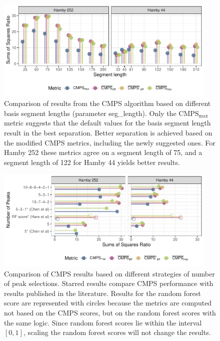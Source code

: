 \begin{Schunk}
\begin{figure}

{\centering \includegraphics[width=400px]{ju-hofmann_files/figure-latex/param-seg-plot-1} 

}

\caption[Comparison of results from the CMPS algorithm based on different basis segment lengths (parameter seg\_length)]{Comparison of results from the CMPS algorithm based on different basis segment lengths (parameter seg\_length). Only the $\mathrm{CMPS_{max}}$ metric suggests that the default values for the basis segment length result in the best separation. Better separation is achieved based on the modified CMPS metrics, including the newly suggested ones. For Hamby 252 these metrics agree on a segment length of 75, and a segment length of 122 for Hamby 44 yields better results. }\label{fig:param-seg-plot}
\end{figure}
\end{Schunk}

\begin{Schunk}
\begin{figure}

{\centering \includegraphics[width=400px]{ju-hofmann_files/figure-latex/param-npeak-plot-1} 

}

\caption[Comparison of CMPS results based on different strategies of number of peak selections]{Comparison of CMPS results based on different strategies of number of peak selections. Starred results compare CMPS performance with results published in the literature. Results for the random forest score are represented with circles because the metrics are computed not based on the CMPS scores, but on the random forest scores with the same logic. Since random forest scores lie within the interval $[0, 1]$, scaling the random forest scores will not change the results.}\label{fig:param-npeak-plot}
\end{figure}
\end{Schunk}

